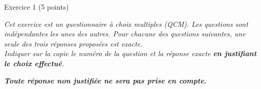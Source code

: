 
%
\begin{h2}Exercice 1 (5 points)\end{h2}
\par
\emph{Cet exercice est un questionnaire à choix multiples (QCM). Les questions sont indépendantes les unes des autres. Pour chacune des questions suivantes, une seule des trois réponses proposées est exacte.  \\Indiquer sur la copie le numéro de la question et la réponse exacte \textbf{en justifiant le choix effectué}. }
\par
\emph{\textbf{Toute réponse non justifiée ne sera pas prise en compte.}}
\par
